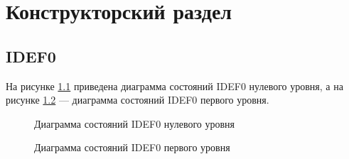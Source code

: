 \chapter{Конструкторский раздел}
\label{cha:design}

\section{IDEF0}

На рисунке \ref{fig:idef0} приведена диаграмма состояний IDEF0 нулевого уровня, а на рисунке \ref{fig:idef1} --- диаграмма состояний IDEF0 первого уровня.

\begin{figure}[ph!]
	\caption{Диаграмма состояний IDEF0 нулевого уровня}
	\label{fig:idef0}
\end{figure}

\begin{figure}[ph!]
	\caption{Диаграмма состояний IDEF0 первого уровня}
	\label{fig:idef1}
\end{figure}

\clearpage


